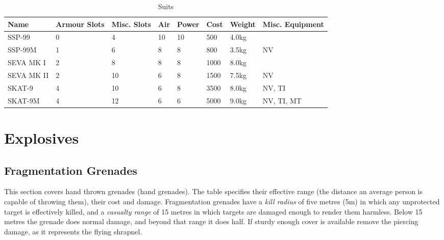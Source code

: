 \begin{table}
  \caption{Suits}
  \label{tab:Suits}
  \begin{center}
    \begin{tabular}{| l | l | l | l | l | l | l | l |}

      \hline
      \textbf{Name} & \textbf{Armour Slots} & \textbf{Misc. Slots} &
      \textbf{Air} & \textbf{Power} & \textbf{Cost} & \textbf{Weight} &
      \textbf{Misc. Equipment} \\ \hline

      SSP-99     & 0 &  4 & 10 & 10 &  500 & 4.0kg & \\ \hline
      SSP-99M    & 1 &  6 &  8 &  8 &  800 & 3.5kg & NV \\ \hline

      SEVA MK I  & 2 &  8 &  8 &  8 & 1000 & 8.0kg & \\ \hline
      SEVA MK II & 2 & 10 &  6 &  8 & 1500 & 7.5kg & NV \\ \hline

      SKAT-9     & 4 & 10 &  6 &  8 & 3500 & 8.0kg & NV, TI \\ \hline
      SKAT-9M    & 4 & 12 &  6 &  6 & 5000 & 9.0kg & NV, TI, MT \\ \hline

    \end{tabular}
  \end{center}
\end{table}


\section{Explosives}

\subsection{Fragmentation Grenades}

This section covers hand thrown grenades (hand grenades). The table specifies
their effective range (the distance an average person is capable of throwing
them), their cost and damage. Fragmentation grenades have a \emph{kill radius}
of five metres (5m) in which any unprotected target is effectively killed, and
a \emph{casualty range} of 15 metres in which targets are damaged enough to
render them harmless. Below 15 metres the grenade does normal damage, and
beyond that range it does half. If sturdy enough cover is available remove
the piercing damage, as it represents the flying shrapnel.


